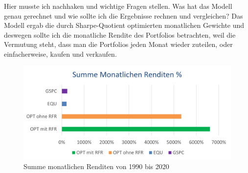 \documentclass[12pt]{article}
\begin{document}
            Hier musste ich nachhaken und wichtige Fragen stellen. Was hat das Modell genau gerechnet 
            und wie sollte ich die Ergebnisse rechnen und vergleichen? 
            Das Modell ergab die durch Sharpe-Quotient optimierten monatlichen Gewichte und 
            deswegen sollte ich die monatliche Rendite des Portfolios betrachten, weil die Vermutung steht, 
            dass man die Portfolios jeden Monat wieder zuteilen, oder einfacherweise, kaufen und verkaufen.
            

            \begin{figure}[ht]
            
                \begin{center}

                    \includegraphics[scale=0.8]{summe-monatlichen-renditen-1990-2020.png}
                    \caption{Summe monatlichen Renditen von 1990 bis 2020}
                    \label{s-m-renditen-fig}
        
                \end{center}
                
            \end{figure}
\end{document}
